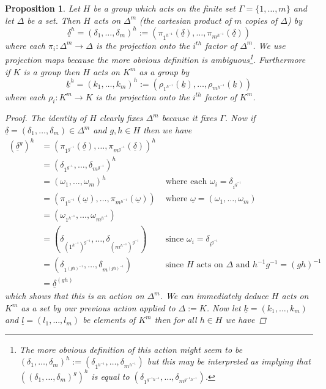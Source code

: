 \documentclass[]{article}
\newtheorem{prop}[thm]{Proposition}
\theoremstyle{definition}
\begin{document}
\begin{prop} \label{prop:wreathaction}
	Let $H$ be a group which acts on the finite set $\Gamma=\{1,\dots,m\}$ and let $\Delta$ be a set. Then $H$ acts on $\Delta^m$ (the cartesian product of $m$ copies of $\Delta$) by
	$$ \underline{\delta}^h=(\delta_1,\dots,\delta_m)^h := (\pi_{1^{h^{-1}}}(\underline{\delta}),\dots, \pi_{m^{h^{-1}}}(\underline{\delta})) $$
	where each $\pi_i:\Delta^m \rightarrow \Delta$ is the projection onto the $i^{th}$ factor of $\Delta^m$. We use projection maps because the more obvious definition is ambiguous\footnote{The more obvious definition of this action might seem to be $(\delta_1,\dots,\delta_m)^h := (\delta_{1^{h^{-1}}},\dots, \delta_{m^{h^{-1}}})$ but this may be interpreted as implying that $((\delta_1,\dots,\delta_m)^g)^h$ is equal to $(\delta_{1^{g^{-1}h^{-1}}},\dots,\delta_{m^{g^{-1}h^{-1}}})$.}. Furthermore if $K$ is a group then $H$ acts on $K^m$ as a group by
	$$ \underline{k}^h=(k_1,\dots,k_m)^h := (\rho_{1^{h^{-1}}}(\underline{k}),\dots, \rho_{m^{h^{-1}}}(\underline{k})) $$
	where each $\rho_i:K^m \rightarrow K$ is the projection onto the $i^{th}$ factor of $K^m$.
	\begin{proof}
	The identity of $H$ clearly fixes $\Delta^m$ because it fixes $\Gamma$. Now if $\underline{\delta}=(\delta_1,\dots,\delta_m) \in \Delta^m$ and $g,h \in H$ then we have
	\begin{align*}
		(\underline{\delta}^g)^h & = (\pi_{1^{g^{-1}}}(\underline{\delta}),\dots, \pi_{m^{g^{-1}}}(\underline{\delta}))^h & \\
		& = (\delta_{1^{g^{-1}}},\dots, \delta_{m^{g^{-1}}})^h \\
		& = (\omega_1,\dots, \omega_m)^h & \mbox{ where each } \omega_i = \delta_{i^{g^{-1}}} \\
		& = (\pi_{1^{h^{-1}}}(\underline{\omega}),\dots, \pi_{m^{h^{-1}}}(\underline{\omega})) & \mbox{ where } \underline{\omega}=(\omega_1,\dots, \omega_m) \\
		& = (\omega_{1^{h^{-1}}},\dots, \omega_{m^{h^{-1}}}) \\
		& = (\delta_{(1^{h^{-1}})^{g^{-1}}}, \dots, \delta_{(m^{h^{-1}})^{g^{-1}}}) & \mbox{ since } \omega_i = \delta_{i^{g^{-1}}} \\
		& = (\delta_{1^{(gh)^{-1}}}, \dots, \delta_{m^{(gh)^{-1}}}) & \mbox{ since } H \mbox{ acts on } \Delta \mbox{ and } h^{-1}g^{-1}=(gh)^{-1} \\
		& = \underline{\delta}^{(gh)} 
	\end{align*}
	which shows that this is an action on $\Delta^m$. We can immediately deduce $H$ acts on $K^m$ as a set by our previous action applied to $\Delta:=K$. Now let $\underline{k}=(k_1,\dots,k_m)$ and $\underline{l}=(l_1,\dots,l_m)$ be elements of $K^m$ then for all $h \in H$ we have

\end{proof}
\end{prop}
\end{document}

